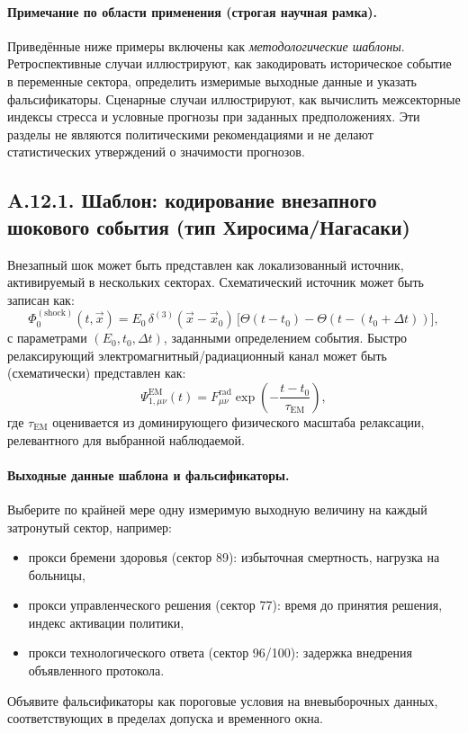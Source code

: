 \documentclass[11pt,a4paper]{article}
\begin{document}
	\paragraph{Примечание по области применения (строгая научная рамка).}
	Приведённые ниже примеры включены как \emph{методологические шаблоны}. Ретроспективные случаи иллюстрируют, как закодировать историческое событие в переменные сектора, определить измеримые выходные данные и указать фальсификаторы. Сценарные случаи иллюстрируют, как вычислить межсекторные индексы стресса и условные прогнозы при заданных предположениях. Эти разделы не являются политическими рекомендациями и не делают статистических утверждений о значимости прогнозов.
	
	\subsection*{A.12.1. Шаблон: кодирование внезапного шокового события (тип Хиросима/Нагасаки)}
	
	Внезапный шок может быть представлен как локализованный источник, активируемый в нескольких секторах. Схематический источник может быть записан как:
	$$
	\Phi_{0}^{(\mathrm{shock})}(t,\vec{x}) = E_0\,\delta^{(3)}(\vec{x}-\vec{x}_0)\,\big[\Theta(t-t_0)-\Theta(t-(t_0+\Delta t))\big],
	$$
	с параметрами $(E_0,t_0,\Delta t)$, заданными определением события. Быстро релаксирующий электромагнитный/радиационный канал может быть (схематически) представлен как:
	$$
	\Psi_{1,\mu\nu}^{\mathrm{EM}}(t)=F_{\mu\nu}^{\mathrm{rad}}\exp\!\left(-\frac{t-t_0}{\tau_{\mathrm{EM}}}\right),
	$$
	где $\tau_{\mathrm{EM}}$ оценивается из доминирующего физического масштаба релаксации, релевантного для выбранной наблюдаемой.
	
	\paragraph{Выходные данные шаблона и фальсификаторы.}
	Выберите по крайней мере одну измеримую выходную величину на каждый затронутый сектор, например:
	\begin{itemize}[leftmargin=*]
		\item прокси бремени здоровья (сектор 89): избыточная смертность, нагрузка на больницы,
		\item прокси управленческого решения (сектор 77): время до принятия решения, индекс активации политики,
		\item прокси технологического ответа (сектор 96/100): задержка внедрения объявленного протокола.
	\end{itemize}
	Объявите фальсификаторы как пороговые условия на вневыборочных данных, соответствующих в пределах допуска и временного окна.
	
\end{document}
